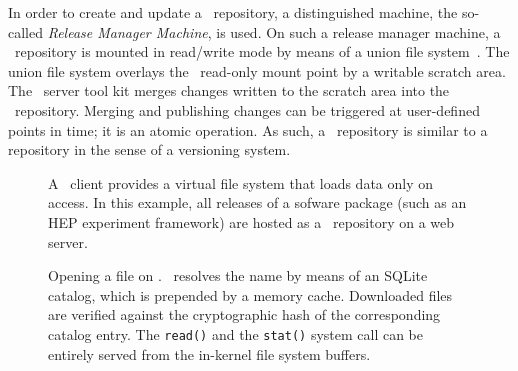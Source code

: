 In order to create and update a \cvmfs\ repository, a distinguished machine, the so-called \emph{Release Manager Machine}, is used.
On such a release manager machine, a \cvmfs\ repository is mounted in read/write mode by means of a union file system~\cite{unionfs04}.
The union file system overlays the \cvmfs\ read-only mount point by a writable scratch area.
The \cvmfs\ server tool kit merges changes written to the scratch area into the \cvmfs\ repository.
Merging and publishing changes can be triggered at user-defined points in time; it is an atomic operation.
As such, a \cvmfs\ repository is similar to a repository in the sense of a versioning system.

\begin{figure}
	\begin{center}
		\resizebox{\textwidth}{!}{}
	\end{center}
	\caption{A \cvmfs\ client provides a virtual file system that loads data only on access.  
		In this example, all releases of a sofware package (such as an HEP experiment framework) are hosted as a \cvmfs\ repository on a web server.}
	\label{fig:concept}
\end{figure}

\begin{figure}
	\begin{center}
		
	\end{center}
	\caption{Opening a file on \cvmfs. \cvmfs\ resolves the name by means of an SQLite catalog, which is prepended by a memory cache. 
		Downloaded files are verified against the cryptographic hash of the corresponding catalog entry. 
		The \texttt{read()} and the \texttt{stat()} system call can be entirely served from the in-kernel file system buffers.}
	\label{fig:fuse}
\end{figure}

